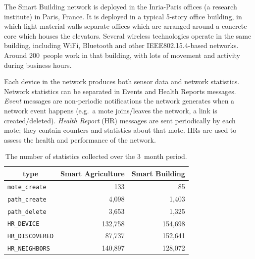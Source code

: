\documentclass{elsarticle}
\newcommand{\building}            {Smart Building\xspace}
\newcommand{\agri}                {Smart Agriculture\xspace}
\newcommand{\HRNEIGHBORS}         {{\tt HR\_NEIGHBORS}\xspace}
\newcommand{\HRDISCOVERED}        {{\tt HR\_DISCOVERED}\xspace}
\newcommand{\HRDEVICE}            {{\tt HR\_DEVICE}\xspace}
\newcommand{\pathcreate}          {{\tt path\_create}\xspace}
\newcommand{\pathdelete}          {{\tt path\_delete}\xspace}
\newcommand{\motecreate}          {{\tt mote\_create}\xspace}
\newcommand{\PEACHNUMHRNEIGHBORS} {140,897\xspace}
\newcommand{\EVANUMHRNEIGHBORS}   {128,072\xspace}
\begin{document}
The \building network is deployed in the Inria-Paris offices (a research institute) in Paris, France.
It is deployed in a typical 5-story office building, in which light-material walls separate offices which are arranged around a concrete core which houses the elevators.
Several wireless technologies operate in the same building, including WiFi, Bluetooth and other IEEE802.15.4-based networks.
Around 200~people work in that building, with lots of movement and activity during business hours.


Each device in the network produces both sensor data and network statistics.
Network statistics can be separated in Events and Health Reports messages.
\textit{Event} messages are non-periodic notifications the network generates when a network event happens (e.g.~a mote joins/leaves the network, a link is created/deleted).
\textit{Health Report} (HR) messages are sent periodically by each mote; they contain counters and statistics about that mote.
HRs are used to assess the health and performance of the network.


\begin{table}
    \centering
    \begin{tabular}{|l|r|r|}
        \toprule
        \multicolumn{1}{|c|}{type} & \multicolumn{1}{|c|}{\agri} & \multicolumn{1}{|c|}{\building} \\ \hline
        \hline
        \motecreate                &                         133 &                              85 \\ \hline
        \pathcreate                &                       4,098 &                           1,403 \\ \hline
        \pathdelete                &                       3,653 &                           1,325 \\ \hline
        \HRDEVICE                  &                     132,758 &                         154,698 \\ \hline
        \HRDISCOVERED              &                      87,737 &                         152,641 \\ \hline
        \HRNEIGHBORS               &        \PEACHNUMHRNEIGHBORS &              \EVANUMHRNEIGHBORS \\ \hline
    \end{tabular}
    \caption{The number of statistics collected over the 3~month period.}
    \label{tab:msg_stats}
\end{table}
\end{document}
